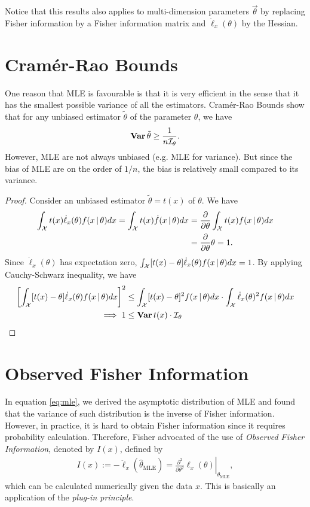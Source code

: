 \documentclass[a4paper,11pt]{article}
\begin{document}
Notice that this results also applies to multi-dimension parameters $\vec{\theta}$
by replacing Fisher information by a Fisher information matrix and $\ddot\ell_{x}(\theta)$ by
the Hessian.

\section{Cram\'er-Rao Bounds}

One reason that MLE is favourable is that it is very efficient in the sense
that it has the smallest possible variance of all the estimators.
Cram\'er-Rao Bounds show that for any unbiased estimator $\tilde{\theta}$
of the parameter $\theta$, we have
\begin{align*}
	\operatorname{\text{\textrm{\upshape\textbf{Var}}}}{\tilde{\theta}}\geq\frac1{n\mathcal{I}_{\theta}}.
\end{align*}
However, MLE are not always unbiased (e.g.\! MLE for variance).
But since the bias of MLE are on the order of $1/n$,
the bias is relatively small compared to its variance.

\begin{proof}
	Consider an unbiased estimator $\tilde{\theta}=t(x)$ of $\theta$.
	We have
	\begin{align*}
		\int_{\mathcal{X}} t(x)\dot\ell_{x}(\theta)f(x\,|\,\theta) d{x}
		= \int_{\mathcal{X}} t(x)\dot f(x\,|\,\theta) d{x}
		&= \frac{\partial}{\partial\theta} \int_{\mathcal{X}} t(x)f(x\,|\,\theta) d{x} \\
		&= \frac{\partial}{\partial\theta} \theta
		= 1.
	\end{align*}
	Since $\dot\ell_{x}(\theta)$ has expectation zero,
	$\int_{\mathcal{X}}[t(x)-\theta]\dot\ell_{x}(\theta)f(x\,|\,\theta)d{x}=1$.
	By applying Cauchy-Schwarz inequality, we have
	\begin{align*}
		\left[\int_{\mathcal{X}}[t(x)-\theta]\dot\ell_{x}(\theta)f(x\,|\,\theta)d{x}\right]^2
		&\leq \int_{\mathcal{X}} [t(x)-\theta]^2 f(x\,|\,\theta) d{x} \cdot
		\int_{\mathcal{X}} \dot\ell_{x}(\theta)^2 f(x\,|\,\theta) d{x} \\
		\implies 1 &\leq \operatorname{\text{\textrm{\upshape\textbf{Var}}}}{t(x)} \cdot \mathcal{I}_{\theta}
	\end{align*}
\end{proof}

\section{Observed Fisher Information}

In equation \eqref{eq:mle},
we derived the asymptotic distribution of MLE and found that
the variance of such distribution is the inverse of Fisher information.
However, in practice, it is hard to obtain Fisher information since it 
requires probability calculation.
Therefore, Fisher advocated of the use of \emph{Observed Fisher Information},
denoted by $I(x)$, defined by
\begin{align*}
	I(x)
	:= -\ddot\ell_{x}(\hat{\theta}_{\text{MLE}})
	= \left. \frac{\partial^2}{\partial\theta^2} \ell_{x}(\theta) \right|_{\hat{\theta}_{\text{MLE}}},
\end{align*}
which can be calculated numerically given the data $x$.
This is basically an application of the \emph{plug-in principle}.
\end{document}
